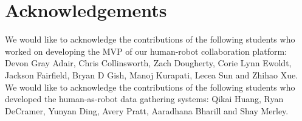 \documentclass[letterpaper]{article} %
\begin{document}
\section*{Acknowledgements}
We would like to acknowledge the contributions of the following students who worked on developing the MVP of our human-robot collaboration platform: Devon Gray Adair, Chris Collinsworth, Zach Dougherty, Corie Lynn Ewoldt, Jackson Fairfield, Bryan D Gish, Manoj Kurapati, Lecea Sun and Zhihao Xue. We  would like to acknowledge the contributions of the following students who developed the human-as-robot data gathering systems: Qikai Huang, Ryan DeCramer, Yunyan Ding, Avery Pratt, Aaradhana Bharill and Shay Merley.
 


\end{document}
